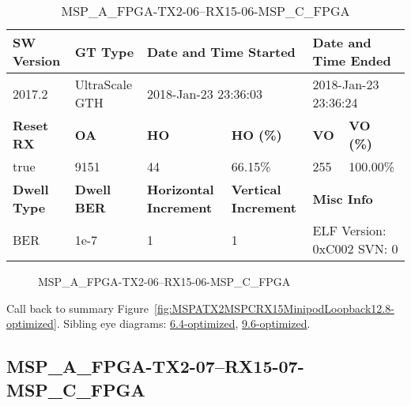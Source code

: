 \begin{table}[h]
\centering
\caption{MSP\_A\_FPGA-TX2-06--RX15-06-MSP\_C\_FPGA}
\label{tab:MSPAFPGATX206RX1506MSPCFPGA12.8-optimized}
\begin{tabular}{@{}|l|l|l|l|l|l|@{}}
\toprule
\textbf{SW Version}                & \textbf{GT Type}   & \multicolumn{2}{l|}{\textbf{Date and Time Started}}            & \multicolumn{2}{l|}{\textbf{Date and Time Ended}}        \\ \midrule
2017.2                       & UltraScale GTH          & \multicolumn{2}{l|}{2018-Jan-23 23:36:03}                   & \multicolumn{2}{l|}{2018-Jan-23 23:36:24}               \\ \midrule
\textbf{Reset RX}                  & \textbf{OA} & \textbf{HO}   & \textbf{HO (\%)} & \textbf{VO} & \textbf{VO (\%)} \\ \midrule
true & 9151        & 44          & 66.15\%        & 255        & 100.00\%       \\ \midrule
\textbf{Dwell Type}                & \textbf{Dwell BER} & \textbf{Horizontal Increment} & \textbf{Vertical Increment}    & \multicolumn{2}{l|}{\textbf{Misc Info}}                  \\ \midrule
BER                            & 1e-7        & 1        & 1           & \multicolumn{2}{l|}{ELF Version: 0xC002 SVN: 0}                         \\ \bottomrule
\end{tabular}
\end{table}

\begin{figure}[h]
\caption{MSP\_A\_FPGA-TX2-06--RX15-06-MSP\_C\_FPGA} \label{fig:MSPAFPGATX206RX1506MSPCFPGA12.8-optimized}
\end{figure}

Call back to summary Figure~\ref{fig:MSPATX2MSPCRX15MinipodLoopback12.8-optimized}.
Sibling eye diagrams: \hyperref[sec:MSPAFPGATX206RX1506MSPCFPGA6.4-optimized]{6.4-optimized}, \hyperref[sec:MSPAFPGATX206RX1506MSPCFPGA9.6-optimized]{9.6-optimized}.

\clearpage
\newpage


\subsection{MSP\_A\_FPGA-TX2-07--RX15-07-MSP\_C\_FPGA}\label{sec:MSPAFPGATX207RX1507MSPCFPGA12.8-optimized}

